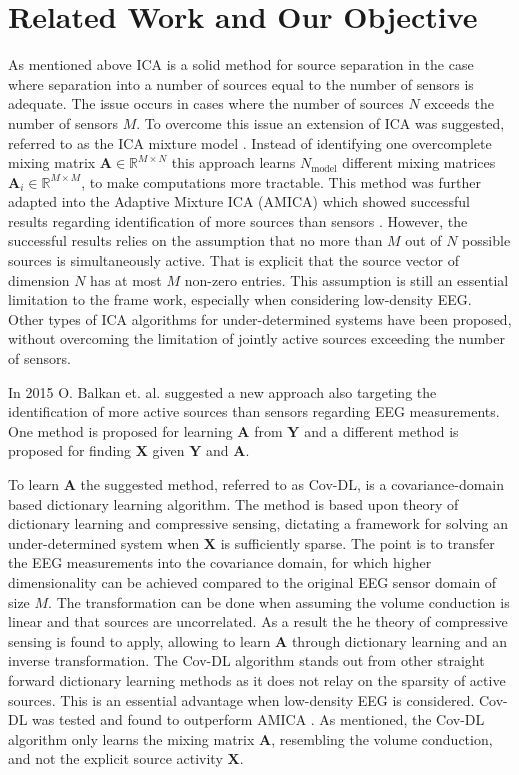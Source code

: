 \section{Related Work and Our Objective} 
As mentioned above ICA is a solid method for source separation in the case where separation into a number of sources equal to the number of sensors is adequate. The issue occurs in cases where the number of sources $N$ exceeds the number of sensors $M$.  
To overcome this issue an extension of ICA was suggested, referred to as the ICA mixture model \cite{Balkan2015}.
Instead of identifying one overcomplete mixing matrix $\mathbf{A} \in \mathbb{R}^{M \times N}$ this approach learns $N_{\text{model}}$ different mixing matrices $\mathbf{A}_i \in \mathbb{R}^{M\times M}$, to make computations more tractable. 
This method was further adapted into the Adaptive Mixture ICA (AMICA) which showed successful results regarding identification of more sources than sensors \cite{Palmer2008}. 
However, the successful results relies on the assumption that no more than $M$ out of $N$ possible sources is simultaneously active. That is explicit that the source vector of dimension $N$ has at most $M$ non-zero entries.
This assumption is still an essential limitation to the frame work, especially when considering low-density EEG. 
Other types of ICA algorithms for under-determined systems have been proposed, without overcoming the limitation of jointly active sources exceeding the number of sensors.

In 2015 O. Balkan et. al. suggested a new approach also targeting the identification of more active sources than sensors regarding EEG measurements. One method is proposed for learning $\textbf{A}$ from $\textbf{Y}$\cite{Balkan2015} and a different method is proposed for finding $\textbf{X}$ given $\textbf{Y}$ and $\textbf{A}$\cite{Balkan2014}.

To learn $\textbf{A}$ the suggested method, referred to as Cov-DL, is a covariance-domain based dictionary learning algorithm. 
The method is based upon theory of dictionary learning and compressive sensing, dictating a framework for solving an under-determined system when $\textbf{X}$ is sufficiently sparse. 
The point is to transfer the EEG measurements into the covariance domain, for which higher dimensionality can be achieved compared to the original EEG sensor domain of size $M$.
The transformation can be done when assuming the volume conduction is linear and that sources are uncorrelated.
As a result the he theory of compressive sensing is found to  apply, allowing to learn $\textbf{A}$ through dictionary learning and an inverse transformation.
The Cov-DL algorithm stands out from other straight forward dictionary learning methods as it does not relay on the sparsity of active sources. This is an essential advantage when low-density EEG is considered. 
Cov-DL was tested and found to outperform AMICA \cite{Balkan2015}.  
As mentioned, the Cov-DL algorithm only learns the mixing matrix $\mathbf{A}$, resembling the volume conduction, and not the explicit source activity $\mathbf{X}$.

